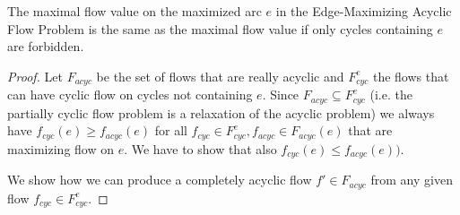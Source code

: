 \begin{prop}
  The maximal flow value on the maximized arc $e$ in the Edge-Maximizing Acyclic Flow Problem is the same as the 
  maximal flow value if only cycles containing $e$ are forbidden. 
\end{prop}
\begin{proof}

 Let $F_{acyc}$ be the set of flows that are really acyclic and $F_{cyc}^e$ the flows that can have cyclic flow on 
 cycles not containing $e$. Since $F_{acyc}\subseteq F_{cyc}^e $ (i.e. the partially cyclic flow problem is a 
 relaxation of the acyclic problem) we always have $f_{cyc}(e)\ge f_{acyc}(e)$ for all $f_{cyc}\in F_{cyc}^e, 
f_{acyc}\in F_{acyc}(e)$ that are maximizing flow on $e$. We have to show that also $f_{cyc}(e)\le f_{acyc}(e))$.

We show how we can produce a completely acyclic flow $f'\in F_{acyc}$ from any given flow $f_{cyc}\in F_{cyc}^e$. 


\end{proof}
